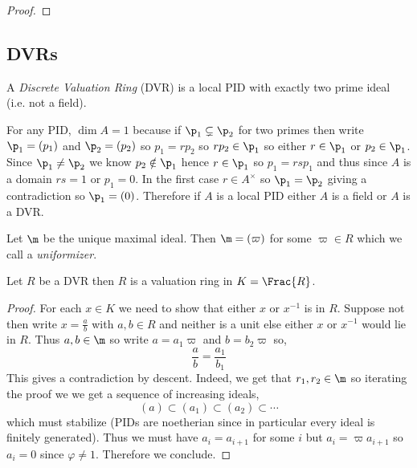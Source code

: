\documentclass[12pt]{article}
\begin{document}
\begin{proof}

\end{proof}

\subsection{DVRs}

\begin{defn}
A \textit{Discrete Valuation Ring} (DVR) is a local PID with exactly two prime ideal (i.e. not a field).
\end{defn}

\begin{rmk}
For any PID, $\dim{A} = 1$ because if $\p_1 \subsetneq \p_2$ for two primes then write $\p_1 = (p_1)$ and $\p_2 = (p_2)$ so $p_1 = r p_2$ so $r p_2 \in \p_1$ so either $r \in \p_1$ or $p_2 \in \p_1$. Since $\p_1 \neq \p_2$ we know $p_2 \notin \p_1$ hence $r \in \p_1$ so $p_1 = rs p_1$ and thus since $A$ is a domain $rs = 1$ or $p_1 = 0$. In the first case $r \in A^\times$ so $\p_1 = \p_2$ giving a contradiction so $\p_1 = (0)$. Therefore if $A$ is a local PID either $A$ is a field or $A$ is a DVR.
\end{rmk}

\begin{rmk}
Let $\m$ be the unique maximal ideal. Then $\m = (\varpi)$ for some $\varpi \in R$ which we call a \textit{uniformizer}. 
\end{rmk}

\begin{prop}
Let $R$ be a DVR then $R$ is a valuation ring in $K = \Frac{R}$.
\end{prop}

\begin{proof}
For each $x \in K$ we need to show that either $x$ or $x^{-1}$ is in $R$. Suppose not then write $x = \frac{a}{b}$ with $a,b \in R$ and neither is a unit else either $x$ or $x^{-1}$ would lie in $R$. Thus $a,b \in \m$ so write $a = a_1 \varpi$ and $b = b_2 \varpi$ so,
\[ \frac{a}{b} = \frac{a_1}{b_1} \]
This gives a contradiction by descent. Indeed, we get that $r_1, r_2 \in \m$ so iterating the proof we we get a sequence of increasing ideals,
\[ (a) \subset (a_1) \subset (a_2) \subset \cdots \]
which must stabilize (PIDs are noetherian since in particular every ideal is finitely generated). Thus we must have $a_i = a_{i+1}$ for some $i$ but $a_i = \varpi a_{i+1}$ so $a_i = 0$ since $\varphi \neq 1$. Therefore we conclude. 
\end{proof}
\end{document}

